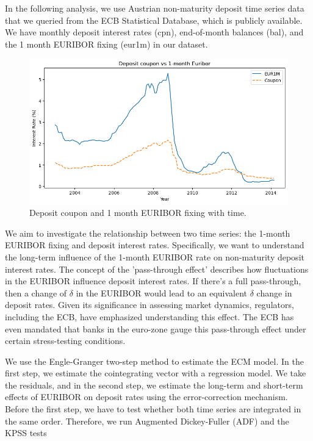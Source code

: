 \documentclass[11pt]{article}
\begin{document}
In the following analysis, we use Austrian non-maturity deposit time series data that we queried from the ECB Statistical Database, which is publicly available. We have monthly deposit interest rates (cpn), end-of-month balances (bal), and the 1 month EURIBOR fixing (eur1m) in our dataset.
\begin{figure}[ht!]
	\centering
	\includegraphics[scale=0.6]{images/cpn_erb}
	\caption{Deposit coupon and 1 month EURIBOR fixing with time.}	
\end{figure}

We aim to investigate the relationship between two time series: the 1-month EURIBOR fixing and deposit interest rates. Specifically, we want to understand the long-term influence of the 1-month EURIBOR rate on non-maturity deposit interest rates. The concept of the 'pass-through effect' describes how fluctuations in the EURIBOR influence deposit interest rates. If there's a full pass-through, then a change of $\delta$ in the EURIBOR would lead to an equivalent $\delta$ change in deposit rates. Given its significance in assessing market dynamics, regulators, including the ECB, have emphasized understanding this effect. The ECB has even mandated that banks in the euro-zone gauge this pass-through effect under certain stress-testing conditions.




We use the Engle-Granger two-step method to estimate the ECM model. In the first step, we estimate the cointegrating vector with a regression model. We take the residuals, and in the second step, we estimate the long-term and short-term effects of EURIBOR on deposit rates using the error-correction mechanism. Before the first step, we have to test whether both time series are integrated in the same order. Therefore, we run Augmented Dickey-Fuller (ADF) and the KPSS tests

\subsubsection{}
\end{document}
